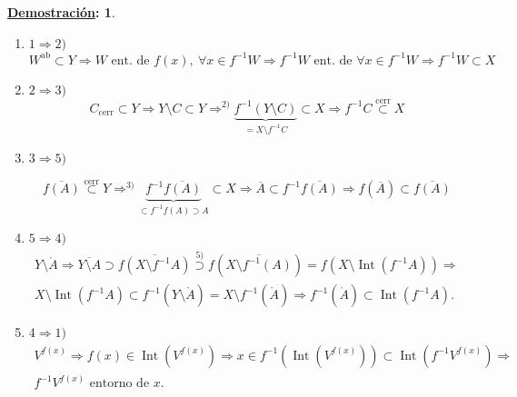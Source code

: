 \documentclass[10pt,a4paper,openright]{book}
\theoremstyle{break}
\newtheorem*{demo}{\underline{Demostración}:}
\DeclareMathOperator{\inter}{Int}
\begin{document}
\begin{demo}
\begin{enumerate}
    \item $1 \Rightarrow 2)$
    \[
        W^{\text{ab}} \subset Y \Rightarrow W \text{ ent. de } f\left( x \right),\ \forall x \in f^{-1}W \Rightarrow f^{-1} W \text{ ent. de } \forall x \in f^{-1}W \Rightarrow f^{-1} W \subset X 
    \]
    \item $2 \Rightarrow 3)$
    \[
        C_{\text{cerr}} \subset Y \Rightarrow Y \setminus C \subset Y \Rightarrow^{2)} \underbrace{f^{-1}\left( Y\setminus C \right)}_{= X \setminus f^{-1}C} \subset X \Rightarrow f^{-1}C \stackrel{\text{cerr}}{\subset} X 
    \]
    \item $3 \Rightarrow 5)$

    \[
        \overline{f\left( A \right)} \stackrel{\text{cerr}}{\subset} Y \Rightarrow^{3)} \underbrace{f^{-1}\overline{f\left( A \right)}}_{\subset f^{-1}f\left( A \right) \supset A} \subset X \Rightarrow \overline{A} \subset f^{-1}\overline{f\left( A \right)} \Rightarrow f\left( \overline{A} \right) \subset \overline{f\left( A \right)} 
    \]
    \item $5 \Rightarrow 4)$
    \begin{gather*}
        Y \setminus \mathring{A}\Rightarrow \overline{Y\setminus A} \supset \overline{f\left( X \setminus f^{-1}A \right)} \stackrel{5)}{\supset} f\left( \overline{X \setminus f^{-1}\left( A \right)} \right) = f\left( X \setminus \inter\left( f^{-1}A \right) \right) \Rightarrow\\
        X \setminus \inter\left( f^{-1}A \right) \subset f^{-1}\left( Y\setminus \mathring{A} \right) = X \setminus f^{-1}\left( \mathring{A} \right)\Rightarrow f^{-1}\left( \mathring{A} \right) \subset \inter\left( f^{-1}A \right) 
    .\end{gather*}

    \item $4 \Rightarrow 1)$
    \begin{gather*}
        V^{f\left( x \right)} \Rightarrow f\left( x \right) \in \inter\left( V^{f\left( x \right)} \right) \Rightarrow x \in f^{-1}\left( \inter\left( V^{f\left( x \right)} \right) \right) \subset \inter\left( f^{-1}V^{f\left( x \right)} \right) \Rightarrow \\
        f^{-1}V^{f\left( x \right) } \text{ entorno de } x.
    \end{gather*}
\end{enumerate}
\end{demo}
\end{document}
